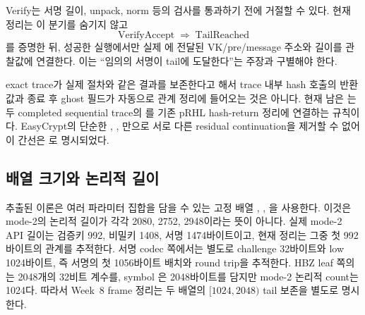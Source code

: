 Verify는 서명 길이, unpack, norm 등의 검사를 통과하기 전에 거절할 수 있다.
현재 정리는 이 분기를 숨기지 않고
\[
  \operatorname{VerifyAccept}\Longrightarrow\operatorname{TailReached}
\]
를 증명한 뒤, 성공한 실행에서만 실제 에 전달된
VK/pre/message 주소와 길이를 관찰값에 연결한다. 이는 ``임의의 서명이 tail에
도달한다''는 주장과 구별해야 한다.

exact trace가 실제 절차와 같은 결과를 보존한다고 해서 trace 내부 hash 호출의
반환값과 종료 후 ghost 필드가 자동으로 관계 정리에 들어오는 것은 아니다.
현재 남은 는 두 completed sequential trace의
를 기존 pRHL hash-return 정리에 연결하는 규칙이다.
EasyCrypt의 단순한 , , 만으로
서로 다른 residual continuation을 제거할 수 없어 이 간선은
\statusdeferred 로 명시되었다.

\subsection{배열 크기와 논리적 길이}

추출된 이론은 여러 파라미터 집합을 담을 수 있는 고정 배열
, ,
을 사용한다. 이것은 mode-2의 논리적 길이가 각각
2080, 2752, 2948이라는 뜻이 아니다. 실제 mode-2 API 길이는 검증키 992,
비밀키 1408, 서명 1474바이트이고, 현재 정리는 그중 첫 992바이트의 관계를
추적한다. 서명 codec 쪽에서는 별도로 challenge 32바이트와 low 1024바이트,
즉 서명의 첫 1056바이트 배치와 round trip을 추적한다. HBZ leaf 쪽의
는 2048개의 32비트 계수를, symbol
은 2048바이트를 담지만 mode-2 논리적 count는 1024다.
따라서 Week~8 frame 정리는 두 배열의 \([1024,2048)\) tail 보존을 별도로
명시한다.
